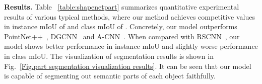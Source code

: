 \documentclass[journal]{IEEEtran}
\def\ie{\emph{i.e.}}
\begin{document}
\noindent\textbf{Results.} Table ~\ref{table:shapenetpart} summarizes quantitative experimental results of various typical methods, where our method achieves competitive values in instance mIoU of  and class mIoU of . Concretely, our model outperforms PointNet++~\cite{qi2017pointnet++}, DGCNN~\cite{wang2019dynamic} and A-CNN~\cite{komarichev2019cnn}. When compared with RSCNN~\cite{liu2019relation}, our model shows better performance in instance mIoU and slightly worse performance in class mIoU. The visualization of segmentation results is shown in Fig.~\ref{Fig.part segmentation visualization results}. It can be seen that our model is capable of segmenting out semantic parts of each object faithfully. 



\begin{comment}
\subsection{Indoor Scene Segmentation}
\noindent\textbf{Dataset} We conduct our experiments on the indoor scene semantic parsing dataset, \ie, S3DIS~\cite{armeni20163d}. This dataset contains 271 rooms in 6 areas, where each point is annotated with one semantic label from 13 classes.

\noindent\textbf{Implementation} Following~\cite{qi2017pointnet}, we split points into blocks of area size 1m  1m. The parameter configurations applied here are similar to those used in the part segmentation task. The difference is that we randomly sample 4,096 points from each block as inputs on-the-fly during training and each point is represented by a 9D vector (XYZ, RGB, and the normalized location). We report results on two settings~\cite{qi2017pointnet,tchapmi2017segcloud,li2018pointcnn}: (i) testing on Area 5 and using others for training; and (ii)
adopting 6-fold cross-validation. For evaluation metrics, mean of class-wise intersection over union (mIoU) and overall point-wise accuracy (OA) are reported.


\end{comment}
\end{document}
